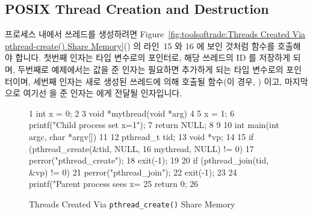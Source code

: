 \subsection{POSIX Thread Creation and Destruction}
\label{sec:toolsoftrade:POSIX Thread Creation and Destruction}

프로세스 내에서 쓰레드를 생성하려면 Figure~\ref{fig:toolsoftrade:Threads
Created Via pthread-create() Share Memory}() 의 라인~15 와 16 에
보인 것처럼  함수를 호출해야 합니다.
첫번째 인자는  타입 변수로의 포인터로, 해당 쓰레드의 ID 를
저장하게 되며, 두번째로 예제에서는  값을 준 인자는 필요하면 추가하게
되는  타입 변수로의 포인터이며, 세번째 인자는 새로 생성된
쓰레드에 의해 호출될 함수(이 경우, ) 이고, 마지막으로 여기선
 을 준 인자는  에게 전달될 인자입니다.

\begin{figure}[tbp]
{ \scriptsize
\begin{verbbox}
  1 int x = 0;
  2 
  3 void *mythread(void *arg)
  4 {
  5   x = 1;
  6   printf("Child process set x=1\n");
  7   return NULL;
  8 }
  9 
 10 int main(int argc, char *argv[])
 11 {
 12   pthread_t tid;
 13   void *vp;
 14 
 15   if (pthread_create(&tid, NULL,
 16                      mythread, NULL) != 0) {
 17     perror("pthread_create");
 18     exit(-1);
 19   }
 20   if (pthread_join(tid, &vp) != 0) {
 21     perror("pthread_join");
 22     exit(-1);
 23   }
 24   printf("Parent process sees x=%
 25   return 0;
 26 }
\end{verbbox}
}
\centering
\theverbbox
\caption{Threads Created Via {\tt pthread\_create()} Share Memory}
\label{fig:toolsoftrade:Threads Created Via pthread-create() Share Memory}
\end{figure}

